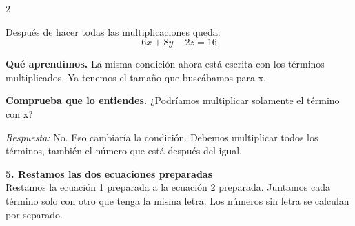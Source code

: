 \documentclass[11pt,a4paper,landscape]{article}
\begin{document}
\begin{multicols*}{2}
\begin{minipage}{\linewidth}
\par{}\par\smallskip
\par\smallskip Después de hacer todas las multiplicaciones queda:
\[6x + 8y - 2z = 16\]
\par\smallskip\textbf{Qué aprendimos.} La misma condición ahora está escrita con los términos multiplicados. Ya tenemos el tamaño que buscábamos para x.
\par\smallskip\textbf{Comprueba que lo entiendes.} ¿Podríamos multiplicar solamente el término con x?\par\textit{Respuesta:} No. Eso cambiaría la condición. Debemos multiplicar todos los términos, también el número que está después del igual.
\end{minipage}\par\medskip
\noindent\begin{minipage}{\linewidth}\textbf{5. Restamos las dos ecuaciones preparadas}\\[2pt]Restamos la ecuación 1 preparada a la ecuación 2 preparada. Juntamos cada término solo con otro que tenga la misma letra. Los números sin letra se calculan por separado.
\par{}\par\smallskip

\end{minipage}
\end{multicols*}
\end{document}
